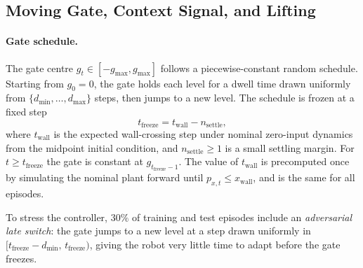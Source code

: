 \documentclass[journal,twoside,web]{ieeecolor}
\begin{document}
\subsection{Moving Gate, Context Signal, and Lifting}
\label{subsec:gate-context}

\paragraph{Gate schedule.}
The gate centre \(g_t\in[-g_{\max},g_{\max}]\) follows a piecewise-constant random
schedule. Starting from \(g_0=0\), the gate holds each level for a dwell time drawn uniformly
from \(\{d_{\min},\dots,d_{\max}\}\) steps, then jumps to a new level. The schedule is
frozen at a fixed step
\begin{equation}
t_{\mathrm{freeze}}
=
t_{\mathrm{wall}}-n_{\mathrm{settle}},
\label{eq:freeze-step}
\end{equation}
where \(t_{\mathrm{wall}}\) is the expected wall-crossing step under nominal zero-input dynamics
from the midpoint initial condition, and \(n_{\mathrm{settle}}\ge 1\) is a small settling margin.
For \(t\ge t_{\mathrm{freeze}}\) the gate is constant at \(g_{t_{\mathrm{freeze}}-1}\).
The value of \(t_{\mathrm{wall}}\) is precomputed once by simulating the nominal plant forward
until \(p_{x,t}\le x_{\mathrm{wall}}\), and is the same for all episodes.

To stress the controller, \(30\%\) of training and test episodes include an \emph{adversarial
late switch}: the gate jumps to a new level at a step drawn uniformly in
\([t_{\mathrm{freeze}}-d_{\min},\, t_{\mathrm{freeze}})\), giving the robot very little time to
adapt before the gate freezes.
\end{document}
